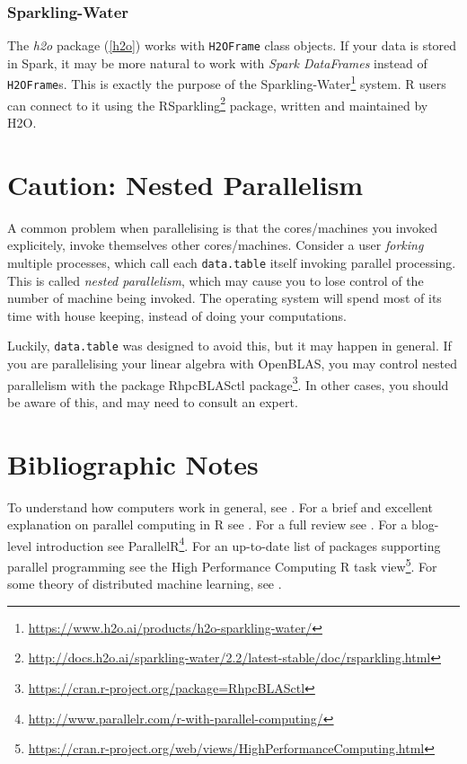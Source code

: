 \documentclass[]{book}
\renewcommand{\href}[2]{#2\footnote{\url{#1}}}
\theoremstyle{definition}
\theoremstyle{definition}
\theoremstyle{definition}
\theoremstyle{remark}
\begin{document}
\hypertarget{sparkling}{%
\subsubsection{Sparkling-Water}\label{sparkling}}

The \emph{h2o} package (\ref{h2o}) works with \texttt{H2OFrame} class objects.
If your data is stored in Spark, it may be more natural to work with \emph{Spark DataFrames} instead of \texttt{H2OFrame}s.
This is exactly the purpose of the \href{https://www.h2o.ai/products/h2o-sparkling-water/}{Sparkling-Water} system.
R users can connect to it using the \href{http://docs.h2o.ai/sparkling-water/2.2/latest-stable/doc/rsparkling.html}{RSparkling} package, written and maintained by H2O.

\hypertarget{nested-parallel}{%
\section{Caution: Nested Parallelism}\label{nested-parallel}}

A common problem when parallelising is that the cores/machines you invoked explicitely, invoke themselves other cores/machines.
Consider a user \emph{forking} multiple processes, which call each \texttt{data.table} itself invoking parallel processing.
This is called \emph{nested parallelism}, which may cause you to lose control of the number of machine being invoked.
The operating system will spend most of its time with house keeping, instead of doing your computations.

Luckily, \texttt{data.table} was designed to avoid this, but it may happen in general.
If you are parallelising your linear algebra with OpenBLAS, you may control nested parallelism with the package \href{https://cran.r-project.org/package=RhpcBLASctl}{RhpcBLASctl package}.
In other cases, you should be aware of this, and may need to consult an expert.

\hypertarget{bibliographic-notes-14}{%
\section{Bibliographic Notes}\label{bibliographic-notes-14}}

To understand how computers work in general, see \citet{bryant2015computer}.
For a brief and excellent explanation on parallel computing in R see \citet{schmidberger2009state}.
For a full review see \citet{chapple2016mastering}.
For a blog-level introduction see \href{http://www.parallelr.com/r-with-parallel-computing/}{ParallelR}.
For an up-to-date list of packages supporting parallel programming see the High Performance Computing \href{https://cran.r-project.org/web/views/HighPerformanceComputing.html}{R task view}.
For some theory of distributed machine learning, see \citet{rosenblatt2016optimality}.
\end{document}
